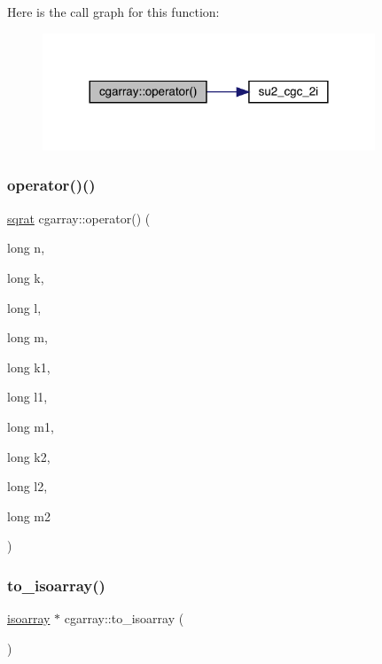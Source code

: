 Here is the call graph for this function\+:
\nopagebreak
\begin{figure}[H]
\begin{center}
\leavevmode
\includegraphics[width=281pt]{d7/d55/classcgarray_ad55c1e537d3070a732d9355ed351d53e_cgraph}
\end{center}
\end{figure}
\mbox{\label{classcgarray_ad55c1e537d3070a732d9355ed351d53e}} 
\subsubsection{\texorpdfstring{operator()()}{operator()()}\hspace{0.1cm}{\footnotesize\ttfamily [3/3]}}
{\footnotesize\ttfamily \mbox{\hyperlink{classsqrat}{sqrat}} cgarray\+::operator() (\begin{DoxyParamCaption}\item[{long}]{n,  }\item[{long}]{k,  }\item[{long}]{l,  }\item[{long}]{m,  }\item[{long}]{k1,  }\item[{long}]{l1,  }\item[{long}]{m1,  }\item[{long}]{k2,  }\item[{long}]{l2,  }\item[{long}]{m2 }\end{DoxyParamCaption})}

\mbox{\label{classcgarray_af65861dda6c89fcaed8b73a40dfe88a6}} 
\subsubsection{\texorpdfstring{to\_isoarray()}{to\_isoarray()}\hspace{0.1cm}{\footnotesize\ttfamily [1/3]}}
{\footnotesize\ttfamily \mbox{\hyperlink{classisoarray}{isoarray}} $\ast$ cgarray\+::to\+\_\+isoarray (\begin{DoxyParamCaption}{ }\end{DoxyParamCaption})}

